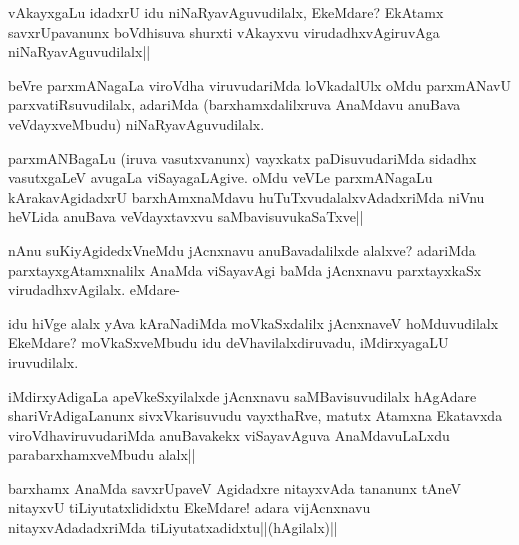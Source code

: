 
\begin{artha}
vAkayxgaLu idadxrU idu niNaRyavAguvudilalx, EkeMdare? EkAtamx savxrUpavanunx boVdhisuva shurxti vAkayxvu virudadhxvAgiruvAga niNaRyavAguvudilalx||
\end{artha}

\begin{artha}
beVre parxmANagaLa viroVdha viruvudariMda loVkadalUlx oMdu parxmANavU parxvatiRsuvudilalx, adariMda (barxhamxdalilxruva AnaMdavu anuBava veVdayxveMbudu) niNaRyavAguvudilalx. 
\end{artha}

\begin{artha}%
parxmANBagaLu (iruva vasutxvanunx) vayxkatx paDisuvudariMda sidadhx vasutxgaLeV avugaLa viSayagaLAgive. oMdu veVLe parxmANagaLu kArakavAgidadxrU barxhAmxnaMdavu huTuTxvudalalxvAdadxriMda niVnu heVLida anuBava veVdayxtavxvu saMbavisuvukaSaTxve||
\end{artha}


\begin{artha}
nAnu suKiyAgidedxVneMdu jAcnxnavu anuBavadalilxde alalxve? adariMda parxtayxgAtamxnalilx AnaMda viSayavAgi baMda jAcnxnavu parxtayxkaSx virudadhxvAgilalx. eMdare-
\end{artha}


\begin{artha}
idu hiVge alalx yAva kAraNadiMda moVkaSxdalilx jAcnxnaveV hoMduvudilalx EkeMdare? moVkaSxveMbudu idu deVhavilalxdiruvadu, iMdirxyagaLU iruvudilalx. 
\end{artha}

\begin{artha}
iMdirxyAdigaLa apeVkeSxyilalxde jAcnxnavu saMBavisuvudilalx hAgAdare shariVrAdigaLanunx sivxVkarisuvudu vayxthaRve, matutx Atamxna Ekatavxda viroVdhaviruvudariMda anuBavakekx viSayavAguva AnaMdavuLaLxdu parabarxhamxveMbudu alalx|| 
\end{artha}%


\begin{artha}
barxhamx AnaMda savxrUpaveV Agidadxre nitayxvAda tananunx tAneV nitayxvU tiLiyutatxlididxtu EkeMdare! adara vijAcnxnavu nitayxvAdadadxriMda tiLiyutatxadidxtu||(hAgilalx)||
\end{artha}

